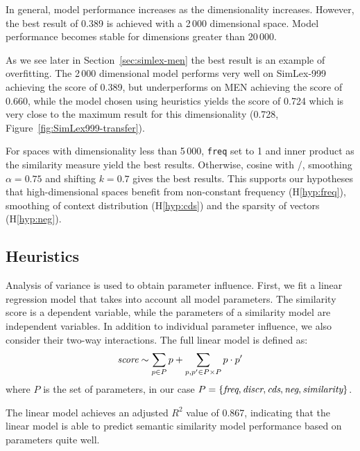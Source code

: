 In general, model performance increases as the dimensionality increases. However, the best result of 0.389 is achieved with a 2\,000 dimensional space. Model performance becomes stable for dimensions greater than 20\,000.



As we see later in Section~\ref{sec:simlex-men} the best result is an example of overfitting. The 2\,000 dimensional model performs very well on SimLex-999 achieving the score of 0.389, but underperforms on MEN achieving the score of 0.660, while the model chosen using heuristics yields the score of 0.724 which is very close to the maximum result for this dimensionality (0.728, Figure~\ref{fig:SimLex999-transfer}).

For spaces with dimensionality less than 5\,000, \texttt{freq} set to 1 and inner product as the similarity measure yield the best results. Otherwise, cosine with \logNSCPMI/, smoothing $\alpha=0.75$ and shifting $k=0.7$ gives the best results. This supports our hypotheses that high-dimensional spaces benefit from non-constant frequency (H\ref{hyp:freq}), smoothing of context distribution (H\ref{hyp:cds}) and the sparsity of vectors (H\ref{hyp:neg}).

\subsection{Heuristics}
\label{sec:heuristics-simlex}

% 

Analysis of variance is used to obtain parameter influence. First, we fit a linear regression model that takes into account all model parameters. The similarity score is a dependent variable, while the parameters of a similarity model are independent variables. In addition to individual parameter influence, we also consider their two-way interactions. The full linear model is defined as:
\begin{equation}
  \text{\it score} \sim \sum_{p \in P}p + \sum_{p, p' \in P \times P}p \cdot p'
\end{equation}
where $P$ is the set of parameters, in our case $P = \{\text{\it freq}, \text{\it discr}, \text{\it cds}, \text{\it neg}, \text{\it similarity} \}$.

The linear model achieves an adjusted $R^2$ value of 0.867, indicating that the linear model is able to predict semantic similarity model performance based on parameters quite well.

